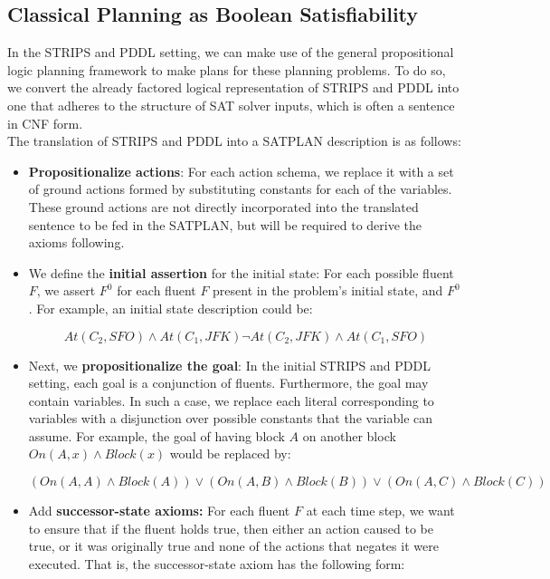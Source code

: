 \documentclass[11pt]{article}
\begin{document}
\subsection{Classical Planning as Boolean Satisfiability}

In the \textsc{STRIPS} and \textsc{PDDL} setting, we can make use of the general propositional logic planning framework to make plans for these planning problems. To do so, we convert the already factored logical representation of \textsc{STRIPS} and \textsc{PDDL} into one that adheres to the structure of SAT solver inputs, which is often a sentence in CNF form. \\

The translation of \textsc{STRIPS} and \textsc{PDDL} into a \textsc{SATPLAN} description is as follows:

\begin{itemize}
    \item \textbf{Propositionalize actions}: For each action schema, we replace it with a set of ground actions formed by substituting constants for each of the variables. These ground actions are not directly incorporated into the translated sentence to be fed in the \textsc{SATPLAN}, but will be required to derive the axioms following.
    \item We define the \textbf{initial assertion} for the initial state: For each possible fluent $F$, we assert $F^0$ for each fluent $F$ present in the problem's initial state, and $F^0$. For example, an initial state description could be:
    
    $$
    At(C_2, SFO) \land At(C_1, JFK) \lnot At(C_2, JFK) \land At(C_1, SFO)
    $$
    \item Next, we \textbf{propositionalize the goal}: In the initial \textsc{STRIPS} and \textsc{PDDL} setting, each goal is a conjunction of fluents. Furthermore, the goal may contain variables. In such a case,  we replace each literal corresponding to variables with a disjunction over possible constants that the variable can assume. For example, the goal of having block $A$ on another block $On(A, x) \land Block(x)$ would be replaced by:
    
    $$
    (On(A, A) \land Block(A)) \lor (On(A, B) \land Block(B)) \lor (On(A, C) \land Block(C)) 
    $$
    
    \item Add \textbf{successor-state axioms:} For each fluent $F$ at each time step, we want to ensure that if the fluent holds true, then either an action caused to be true, or it was originally true and none of the actions that negates it were executed. That is, the successor-state axiom has the following form:
    

\end{itemize}
\end{document}
